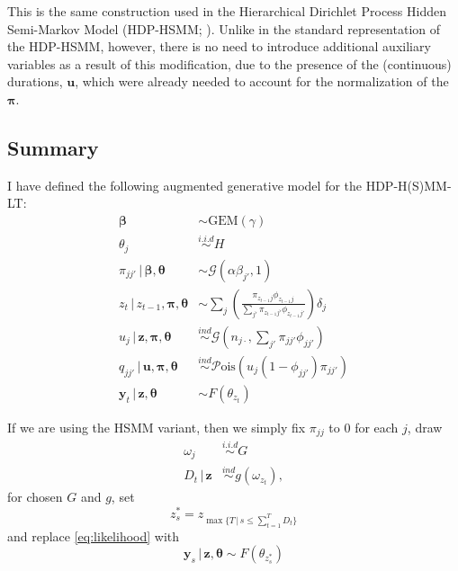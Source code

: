 \documentclass[12pt,letterpaper]{report}
\newcommand{\Pois}[1]{\mathcal{P}\mathrm{ois}(#1)}
\newcommand{\Gamm}[2]{\mathcal{G}(#1,#2)}
\newcommand{\given}{\, \vert \,}
\newcommand{\by}{\mathbf{y}}
\newcommand{\bz}{\mathbf{z}}
\newcommand{\bu}{\mathbf{u}}
\newcommand{\bbeta}{\boldsymbol{\beta}}
\newcommand{\btheta}{\boldsymbol{\theta}}
\newcommand{\bpi}{\boldsymbol{\pi}}
\begin{document}
This is the same construction used in the Hierarchical Dirichlet
Process Hidden Semi-Markov Model (HDP-HSMM;
\citet{johnson2013bayesian}).  
Unlike in the standard representation of the HDP-HSMM,
however, there is no need to introduce
additional auxiliary variables as a result of this modification, due
to the presence of the (continuous) durations, $\bu$, which were
already needed to account for the normalization of the $\bpi$.

\subsection{Summary}
\label{sec:model-summary}

I have defined the following augmented generative model for the
HDP-H(S)MM-LT:
\begin{align}
  \label{eq:96}
  \bbeta &\sim \mathrm{GEM}(\gamma) \\
  \theta_j &\stackrel{i.i.d}{\sim} H \\
  \pi_{jj'} \given \bbeta, \btheta &\sim \Gamm{\alpha \beta_{j'}}{1}
  \\
  z_{t} \given z_{t-1}, \bpi, \btheta &\sim \sum_{j}
  \left(\frac{\pi_{z_{t-1}j}\phi_{z_{t-1}j}}{\sum_{j'}
    \pi_{z_{t-1}j'}\phi_{z_{t-1}j'}}\right)\delta_j \\
  u_j \given \bz, \bpi, \btheta &\stackrel{ind}{\sim}
  \Gamm{n_{j\cdot}}{\sum_{j'} \pi_{jj'}\phi_{jj'}} \\
  q_{jj'} \given \bu, \bpi, \btheta &\stackrel{ind}{\sim}
  \Pois{u_j(1 - \phi_{jj'})\pi_{jj'}} \\
  \label{eq:likelihood} \by_t \given \bz, \btheta &\sim F(\theta_{z_t})
\end{align}

If we are using the HSMM variant, then we simply fix $\pi_{jj}$ to 0
for each $j$, draw
\begin{align}
  \label{eq:97}
  \omega_j &\stackrel{i.i.d}{\sim} G \\
  D_t \given \bz &\stackrel{ind}{\sim} g(\omega_{z_t}),
\end{align}
for chosen $G$ and $g$, set
\begin{equation}
  \label{eq:98}
  z^*_s = z_{\max\{T \given s \leq \sum_{t=1}^T D_t\}}
\end{equation}
and replace \eqref{eq:likelihood} with
\begin{equation}
  \label{eq:likelihood-hsmm} \by_s \given \bz, \btheta \sim F(\theta_{z^*_s})
\end{equation}
\end{document}

